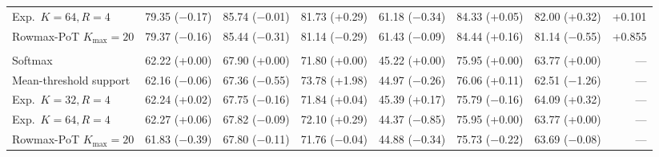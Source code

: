 \begin{table}[!htbp]
\begin{tabular}{@{}lrrrrrrr@{}}
    \quad Exp.\ $K=64,R=4$ & 79.35 ($-$0.17) & 85.74 ($-$0.01) & 81.73 (+0.29) & 61.18 ($-$0.34) & 84.33 (+0.05) & 82.00 (+0.32) & +0.101 \\
    \quad Rowmax-PoT $K_{\max}=20$ & 79.37 ($-$0.16) & 85.44 ($-$0.31) & 81.14 ($-$0.29) & 61.43 ($-$0.09) & 84.44 (+0.16) & 81.14 ($-$0.55) & +0.855 \\
    \addlinespace
    \multicolumn{8}{@{}l}{\textbf{Qwen2.5-1.5B}} \\
    \quad Softmax & 62.22 (+0.00) & 67.90 (+0.00) & 71.80 (+0.00) & 45.22 (+0.00) & 75.95 (+0.00) & 63.77 (+0.00) & --- \\
    \quad Mean-threshold support & 62.16 ($-$0.06) & 67.36 ($-$0.55) & 73.78 (+1.98) & 44.97 ($-$0.26) & 76.06 (+0.11) & 62.51 ($-$1.26) & --- \\
    \quad Exp.\ $K=32,R=4$ & 62.24 (+0.02) & 67.75 ($-$0.16) & 71.84 (+0.04) & 45.39 (+0.17) & 75.79 ($-$0.16) & 64.09 (+0.32) & --- \\
    \quad Exp.\ $K=64,R=4$ & 62.27 (+0.06) & 67.82 ($-$0.09) & 72.10 (+0.29) & 44.37 ($-$0.85) & 75.95 (+0.00) & 63.77 (+0.00) & --- \\
    \quad Rowmax-PoT $K_{\max}=20$ & 61.83 ($-$0.39) & 67.80 ($-$0.11) & 71.76 ($-$0.04) & 44.88 ($-$0.34) & 75.73 ($-$0.22) & 63.69 ($-$0.08) & --- \\
    \bottomrule
  \end{tabular}
\end{table}
